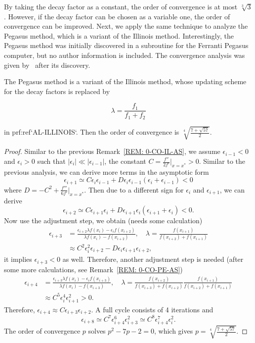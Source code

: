By taking the decay factor as a constant, the order of convergence is at most $\sqrt[3]{3}$. However, if the decay factor can be chosen as a variable one, the order of convergence can be improved. Next, we apply the same technique to analyze the Pegasus method, which is a variant of the Illinois method. Interestingly, the Pegasus method was initially discovered in a subroutine for the Ferranti Pegasus computer, but no author information is included. The convergence analysis was given by~\cite{dowell1972pegasus} after its discovery.

\begin{theorem}
    \label{THM: 0-PE-ME}
The Pegasus method is a variant of the Illinois method, whose updating scheme for the decay factors is replaced by 

$$\lambda=\frac{f_1}{f_1+f_2}$$ 

in {prf:ref}`AL-ILLINOIS`. Then the order of convergence is $\sqrt[4]{\frac{7+\sqrt{57}}{2}}$.    
\end{theorem}

\begin{proof}
Similar to the previous Remark~\ref{REM: 0-CO-IL-AS}, we assume $\epsilon_{i-1} < 0$ and $\epsilon_{i} > 0$ such that $|\epsilon_i|\ll |\epsilon_{i-1}|$, the constant $C = \frac{f''}{2f'}|_{x=x^{\ast}} > 0$.
Similar to the previous analysis, we can derive more terms in the asymptotic form
$$
\epsilon_{i+1}\simeq C \epsilon_{i}\epsilon_{i-1} + D \epsilon_{i} \epsilon_{i-1}(\epsilon_{i} + \epsilon_{i-1})< 0
$$
where $D = -C^2 + \frac{f'''}{6f'}|_{x=x^{\ast}}$. Then due to a different sign for $\epsilon_{i}$ and $\epsilon_{i+1}$, we can derive 
$$\epsilon_{i+2}\simeq C \epsilon_{i+1}\epsilon_{i} + D \epsilon_{i+1} \epsilon_{i}(\epsilon_{i+1} + \epsilon_{i}) < 0.$$
Now use the adjustment step, we obtain (needs some calculation)
$$
\begin{aligned}
\epsilon_{i+3} &= \frac{\epsilon_{i+2}\lambda f(x_i) - \epsilon_i f(x_{i+2})}{\lambda f(x_{i}) - f(x_{i+2})},\quad \lambda = \frac{f(x_{i+1})}{f(x_{i+2}) + f(x_{i+1})}\\
&\approx C^2 \epsilon_{i}^2\epsilon_{i+2} - D \epsilon_{i} \epsilon_{i+1} \epsilon_{i+2}, 
\end{aligned}
$$
it implies $\epsilon_{i+3} < 0$ as well. Therefore, another adjustment step is needed (after some more calculations, see Remark~\ref{REM: 0-CO-PE-AS})
$$
\begin{aligned}
\epsilon_{i+4} &=  \frac{\epsilon_{i+3}\lambda f(x_i) - \epsilon_i f(x_{i+3})}{\lambda f(x_{i}) - f(x_{i+3})},\quad \lambda = \frac{f(x_{i+2})}{f(x_{i+3}) + f(x_{i+2})}\frac{f(x_{i+1})}{f(x_{i+2}) + f(x_{i+1})}\\
&\approx C^5 \epsilon_{i}^4\epsilon_{i+1}^2 > 0.
\end{aligned}
$$
Therefore, $\epsilon_{i+4}\approx C \epsilon_{i+3} \epsilon_{i+2}$. A full cycle consists of 4 iterations and 
$$
\epsilon_{i+8} \simeq C^7 \epsilon_{i+4}^6 \epsilon_{i+3}^2 \simeq C^{8}\epsilon_{i+4}^7 \epsilon_i^2.
$$
The order of convergence $p$ solves $p^2 - 7p - 2 = 0$, which gives $p = \sqrt[4]{\frac{7+\sqrt{57}}{2}}$.
\end{proof}

